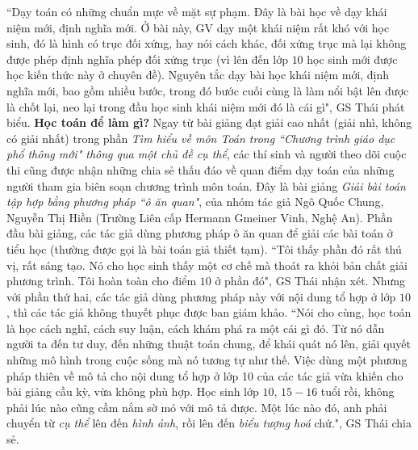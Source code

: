 \begin{multicols}{2}
	\vskip 0.1cm
	``Dạy toán có những chuẩn mực về mặt sự phạm. Đây là bài học về dạy khái niệm mới, định nghĩa mới. Ở bài này, GV dạy một khái niệm rất khó với học sinh, đó là hình có trục đối xứng, hay nói cách khác, đối xứng trục mà lại không được phép định nghĩa phép đối xứng trục (vì lên đến lớp $10$ học sinh mới được học kiến thức này ở chuyên đề). Nguyên tắc dạy bài học khái niệm mới, định nghĩa mới, bao gồm nhiều bước, trong đó bước cuối cùng là làm nổi bật lên được là chốt lại, neo lại trong đầu học sinh khái niệm mới đó là cái gì", GS Thái phát biểu. 
	\vskip 0.1cm
	\textbf{\color{diendantoanhoc}Học toán để làm gì?} 
	\vskip 0.1cm
	Ngay từ bài giảng đạt giải cao nhất (giải nhì, không có giải nhất) trong phần \textit{Tìm hiểu về môn Toán trong ``Chương trình giáo dục phổ thông mới" thông qua một chủ đề cụ thể}, các thí sinh và người theo dõi cuộc thi cũng được nhận những chia sẻ thấu đáo về quan điểm dạy toán của những người tham gia biên soạn chương trình môn toán. Đây là bài giảng \textit{Giải bài toán tập hợp bằng phương pháp ``ô ăn quan"}, của nhóm tác giả Ngô Quốc Chung, Nguyễn Thị Hiền (Trường Liên cấp Hermann Gmeiner Vinh, Nghệ An). Phần đầu bài giảng, các tác giả dùng phương pháp ô ăn quan để giải các bài toán ở tiểu học (thường được gọi là bài toán giả thiết tạm). ``Tôi thấy phần đó rất thú vị, rất sáng tạo. Nó cho học sinh thấy một cơ chế mà thoát ra khỏi bản chất giải phương trình. Tôi hoàn toàn cho điểm $10$ ở phần đó", GS Thái nhận xét.
	\vskip 0.1cm
	Nhưng với phần thứ hai, các tác giả dùng phương pháp này với nội dung tổ hợp ở lớp $10$, thì các tác giả không thuyết phục được ban giám khảo. ``Nói cho cùng, học toán là học cách nghĩ, cách suy luận, cách khám phá ra một cái gì đó. Từ nó dẫn người ta đến tư duy, đến những thuật toán chung, để khái quát nó lên, giải quyết những mô hình trong cuộc sống mà nó tương tự như thế. Việc dùng một phương pháp thiên về mô tả cho nội dung tổ hợp ở lớp 10 của các tác giả vừa khiến cho bài giảng cầu kỳ, vừa không phù hợp.  Học sinh lớp $10$, $15-16$ tuổi rồi, không phải lúc nào cũng cầm nắm sờ mó với mô tả được. Một lúc nào đó, anh phải chuyển từ \textit{cụ thể} lên đến \textit{hình ảnh}, rồi lên đến \textit{biểu tượng hoá} chứ.",  GS Thái chia sẻ.
	\vskip 0.1cm

\end{multicols}
